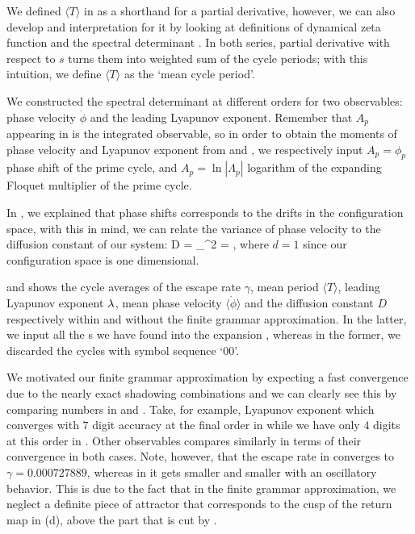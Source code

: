 {{{We defined $\langle T \rangle$ in  as a shorthand for a partial
derivative, however, we can also develop and interpretation for it by looking at
definitions of dynamical zeta function  and the spectral
determinant . In both series, partial derivative with
respect to $s$ turns them into weighted sum of the cycle periods; with this intuition,
we define $\langle T \rangle$ as the `mean cycle period'.

We constructed the spectral determinant  at different
orders for two observables: phase velocity $\dot{\phi}$ and the leading Lyapunov
exponent. Remember that $A_p$ appearing in  is the
integrated observable, so in order to obtain the moments of phase velocity and
Lyapunov exponent from  and , we respectively input
$A_p = \phi_p$ phase shift of the prime cycle, and $A_p = \ln |\Lambda_p|$ logarithm
of the expanding Floquet multiplier of the prime cycle.

In , we explained that  phase shifts corresponds to
the drifts in the configuration space, with this in mind, we can relate the
variance of phase velocity to the diffusion constant of our system:
\beq
    D =  \sigma_{\dot{\phi}}^2
      =  ,
\eeq
where $d=1$ since our configuration space is one dimensional.

 and  shows
the cycle averages of the escape rate $\gamma$, mean period $\langle T \rangle$,
leading Lyapunov exponent $\lambda$, mean phase velocity $\langle \dot{\phi} \rangle$
and the diffusion constant $D$ respectively within and without the finite grammar
approximation. In the latter, we input all the \rpo s we have found into the expansion
, whereas in the former, we discarded the cycles
with symbol sequence `00'.




We motivated our finite grammar approximation by expecting a fast convergence
due to the nearly exact shadowing combinations and we can clearly see this
by comparing numbers in
 and .
Take, for example, Lyapunov exponent which converges with $7$ digit accuracy
at the final order in  while we have only $4$ digits
at this order in . Other observables compares
similarly in terms of their convergence in both cases. Note, however, that the
escape rate in  converges to $\gamma = 0.000727889$,
whereas in  it gets smaller and smaller
with an oscillatory behavior. This is due to the fact that in the finite grammar
approximation, we neglect a definite piece of attractor that corresponds to the
cusp of the return map in  (d), above the part that
is cut by .

}}}
